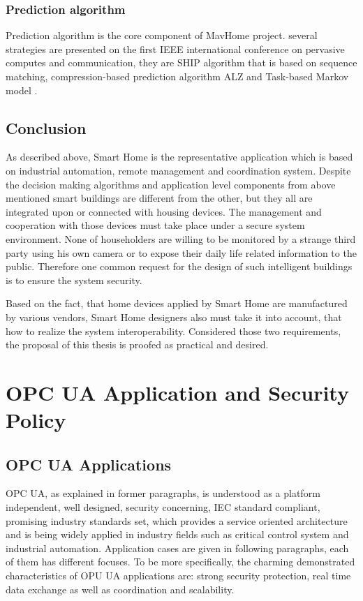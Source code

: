 \subsubsection{Prediction algorithm}
Prediction algorithm is the core component of MavHome project. several strategies are presented on the first IEEE international conference on pervasive computes and communication, they are SHIP algorithm that is based on sequence matching, compression-based prediction algorithm ALZ and Task-based Markov model \cite{smart_home_agent}.

\subsection{Conclusion}
As described above, Smart Home is the representative application which is based on industrial automation, remote management and coordination system. Despite the decision making algorithms and application level components from above mentioned smart buildings are different from the other, but they all are integrated upon or connected with housing devices. The management and cooperation with those devices must take place under a secure system environment. None of householders are willing to be monitored by a strange third party using his own camera or to expose their daily life related information to the public. Therefore one common request for the design of such intelligent buildings is to ensure the system security.

Based on the fact, that home devices applied by Smart Home are manufactured by various vendors,  Smart Home designers also must take it into account, that how to realize the system interoperability. Considered those two requirements, the proposal of this thesis is proofed as practical and desired.

\section{OPC UA Application and Security Policy}

\subsection{OPC UA Applications}
OPC UA, as explained in former paragraphs,  is understood as a platform independent, well designed, security concerning, IEC standard compliant, promising industry standards set, which provides a service oriented architecture and is being widely applied in industry fields such as critical control system and industrial automation. Application cases are given in following paragraphs, each of them has different focuses. To be more specifically, the charming demonstrated characteristics of OPU UA applications are: strong security protection, real time data exchange as well as coordination and scalability. 

